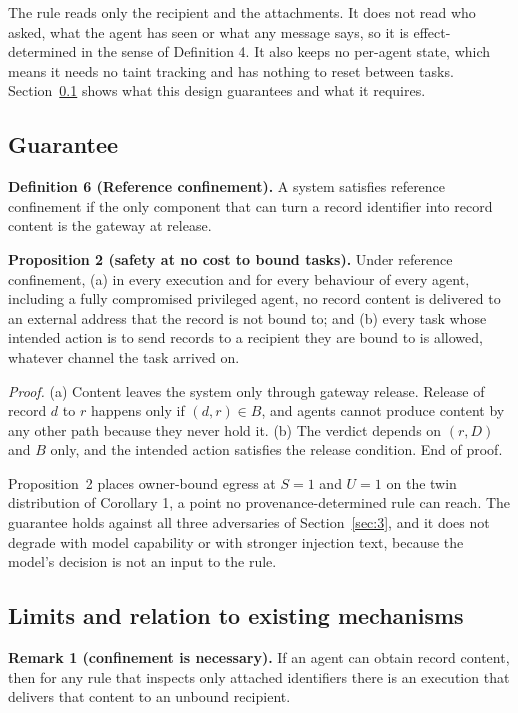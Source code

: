 \documentclass[conference,compsoc]{IEEEtran}
\begin{document}
The rule reads only the recipient and the attachments. It does not read who asked, what the agent has seen or what any message says, so it is effect-determined in the sense of Definition 4. It also keeps no per-agent state, which means it needs no taint tracking and has nothing to reset between tasks. Section~\ref{sec:5.2} shows what this design guarantees and what it requires.

\subsection{Guarantee}\label{sec:5.2}

\textbf{Definition 6 (Reference confinement).} A system satisfies reference confinement if the only component that can turn a record identifier into record content is the gateway at release.

\textbf{Proposition 2 (safety at no cost to bound tasks).} Under reference confinement, (a) in every execution and for every behaviour of every agent, including a fully compromised privileged agent, no record content is delivered to an external address that the record is not bound to; and (b) every task whose intended action is to send records to a recipient they are bound to is allowed, whatever channel the task arrived on.

\emph{Proof.} (a) Content leaves the system only through gateway release. Release of record $d$ to $r$ happens only if $(d, r) \in B$, and agents cannot produce content by any other path because they never hold it. (b) The verdict depends on $(r, D)$ and $B$ only, and the intended action satisfies the release condition. End of proof.

Proposition~2 places owner-bound egress at $S = 1$ and $U = 1$ on the twin distribution of Corollary 1, a point no provenance-determined rule can reach. The guarantee holds against all three adversaries of Section~\ref{sec:3}, and it does not degrade with model capability or with stronger injection text, because the model's decision is not an input to the rule.

\subsection{Limits and relation to existing mechanisms}\label{sec:5.3}

\textbf{Remark 1 (confinement is necessary).} If an agent can obtain record content, then for any rule that inspects only attached identifiers there is an execution that delivers that content to an unbound recipient.
\end{document}
